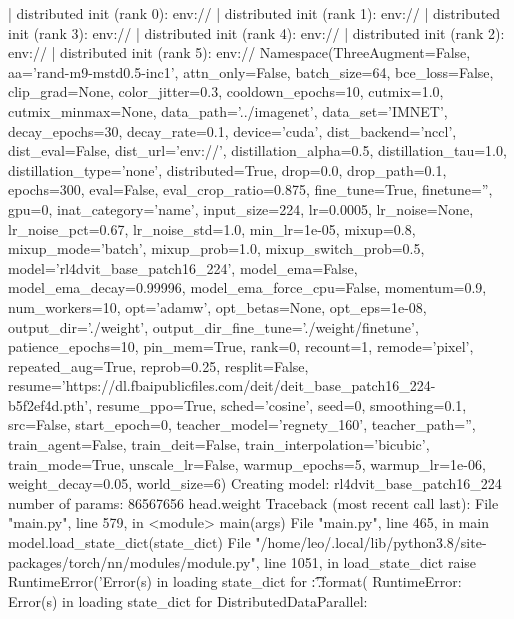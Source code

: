 | distributed init (rank 0): env://
| distributed init (rank 1): env://
| distributed init (rank 3): env://
| distributed init (rank 4): env://
| distributed init (rank 2): env://
| distributed init (rank 5): env://
Namespace(ThreeAugment=False, aa='rand-m9-mstd0.5-inc1', attn_only=False, batch_size=64, bce_loss=False, clip_grad=None, color_jitter=0.3, cooldown_epochs=10, cutmix=1.0, cutmix_minmax=None, data_path='../imagenet', data_set='IMNET', decay_epochs=30, decay_rate=0.1, device='cuda', dist_backend='nccl', dist_eval=False, dist_url='env://', distillation_alpha=0.5, distillation_tau=1.0, distillation_type='none', distributed=True, drop=0.0, drop_path=0.1, epochs=300, eval=False, eval_crop_ratio=0.875, fine_tune=True, finetune='', gpu=0, inat_category='name', input_size=224, lr=0.0005, lr_noise=None, lr_noise_pct=0.67, lr_noise_std=1.0, min_lr=1e-05, mixup=0.8, mixup_mode='batch', mixup_prob=1.0, mixup_switch_prob=0.5, model='rl4dvit_base_patch16_224', model_ema=False, model_ema_decay=0.99996, model_ema_force_cpu=False, momentum=0.9, num_workers=10, opt='adamw', opt_betas=None, opt_eps=1e-08, output_dir='./weight', output_dir_fine_tune='./weight/finetune', patience_epochs=10, pin_mem=True, rank=0, recount=1, remode='pixel', repeated_aug=True, reprob=0.25, resplit=False, resume='https://dl.fbaipublicfiles.com/deit/deit_base_patch16_224-b5f2ef4d.pth', resume_ppo=True, sched='cosine', seed=0, smoothing=0.1, src=False, start_epoch=0, teacher_model='regnety_160', teacher_path='', train_agent=False, train_deit=False, train_interpolation='bicubic', train_mode=True, unscale_lr=False, warmup_epochs=5, warmup_lr=1e-06, weight_decay=0.05, world_size=6)
Creating model: rl4dvit_base_patch16_224
number of params: 86567656
head.weight
Traceback (most recent call last):
  File "main.py", line 579, in <module>
    main(args)
  File "main.py", line 465, in main
    model.load_state_dict(state_dict)
  File "/home/leo/.local/lib/python3.8/site-packages/torch/nn/modules/module.py", line 1051, in load_state_dict
    raise RuntimeError('Error(s) in loading state_dict for {}:\n\t{}'.format(
RuntimeError: Error(s) in loading state_dict for DistributedDataParallel:
